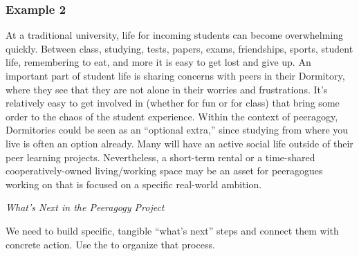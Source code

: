 \subsubsection*{Example 2}
At a traditional university, life for incoming students can become overwhelming quickly.  Between class, studying, tests, papers, exams, friendships, sports, student life, remembering to eat, and more it is easy to get lost and give up.  An important part of student life is sharing concerns with peers in their Dormitory, where they see that they are not alone in their worries and frustrations.  It's relatively easy to get involved in  (whether for fun or for class) that bring some order to the chaos of the student experience. Within the context of peeragogy, Dormitories could be seen as an ``optional extra,'' since studying
from where you live is often an option already.  Many will have an active social life outside of their peer learning projects. Nevertheless, a short-term rental or a time-shared cooperatively-owned living/working space may be an asset for peeragogues working on  that is focused on a specific real-world ambition.


\begin{framed}
\noindent 
\emph{What's Next in the Peeragogy Project}
\begin{collectinmacro}{\SpecificWN}{}{}
We need to build specific, tangible ``what's next'' steps and connect them with concrete action. Use the  to organize that process. 
\end{collectinmacro}
\SpecificWN
\end{framed}

